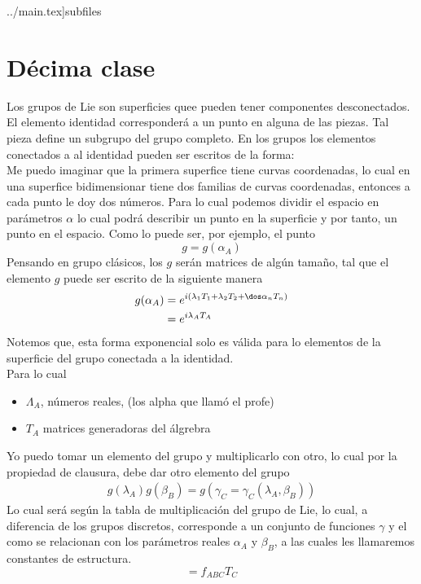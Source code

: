 \documentclasss ../main.tex]{subfiles}


\section{Décima clase}
Los grupos de Lie son superficies quee pueden tener componentes desconectados. El elemento identidad corresponderá a un punto en alguna de las piezas. Tal pieza define un subgrupo del grupo completo. En los grupos los elementos conectados a al identidad pueden ser escritos de la forma: \\
Me puedo imaginar que la primera superfice tiene curvas coordenadas, lo cual en una superfice bidimensionar tiene dos familias de curvas coordenadas, entonces a cada punto le doy dos números. Para lo cual podemos dividir el espacio en parámetros $\alpha$ lo cual podrá describir un punto en la superficie y por tanto, un punto en el espacio. Como lo puede ser, por ejemplo, el punto
\begin{equation*}
  g = g(\alpha_A)
\end{equation*}
Pensando en grupo clásicos, los $g$ serán matrices de algún tamaño, tal que el elemento $g$ puede ser escrito de la siguiente manera
\begin{align*}
  g(\alpha_A)  & = e^{i(\lambda_1T_1+\lambda_2T_2 +\dos \alpha_nT_n)} \\
  & = e^{i\lambda_AT_A}
\end{align*}
Notemos que, esta forma exponencial solo es válida para lo elementos de la superficie del grupo conectada a la identidad. \\
Para lo cual
\begin{itemize}
  \item $\Lambda_A$, números reales, (los alpha que llamó el profe)
  \item $T_A$ matrices generadoras del álgrebra 
\end{itemize}
Yo puedo tomar un elemento del grupo y multiplicarlo con otro, lo cual por la propiedad de clausura, debe dar otro elemento del grupo
\begin{align*}
  g(\lambda_A) g(\beta_B) = g(\gamma_C= \gamma_C(\lambda_A,\beta_B))
\end{align*}
Lo cual será según la tabla de multiplicación del grupo de Lie, lo cual, a diferencia de los grupos discretos, corresponde a un conjunto de funciones $\gamma$ y el como se relacionan con los parámetros reales $\alpha_A$ y $\beta_B$, a las cuales les llamaremos constantes de estructura. 
\begin{equation*}
  [T_A,T_B] = f_{ABC}T_C
\end{equation*}
